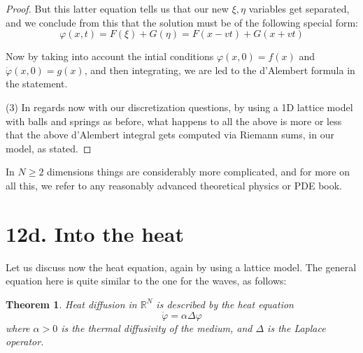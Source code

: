 \documentclass[12pt]{amsbook}
\newtheorem{theorem}{Theorem}[chapter]
\begin{document}
\begin{proof}
But this latter equation tells us that our new $\xi,\eta$ variables get separated, and we conclude from this that the solution must be of the following special form:
$$\varphi(x,t)=F(\xi)+G(\eta)=F(x-vt)+G(x+vt)$$

Now by taking into account the intial conditions $\varphi(x,0)=f(x)$ and $\dot{\varphi}(x,0)=g(x)$, and then integrating, we are led to the d'Alembert formula in the statement.

\medskip

(3) In regards now with our discretization questions, by using a 1D lattice model with balls and springs as before, what happens to all the above is more or less that the above d'Alembert integral gets computed via Riemann sums, in our model, as stated.
\end{proof}

In $N\geq2$ dimensions things are considerably more complicated, and for more on all this, we refer to any reasonably advanced theoretical physics or PDE book.

\section*{12d. Into the heat} 

Let us discuss now the heat equation, again by using a lattice model. The general equation here is quite similar to the one for the waves, as follows:


\begin{theorem}
Heat diffusion in $\mathbb R^N$ is described by the heat equation
$$\dot{\varphi}=\alpha\Delta\varphi$$
where $\alpha>0$ is the thermal diffusivity of the medium, and $\Delta$ is the Laplace operator.
\end{theorem}
\end{document}
